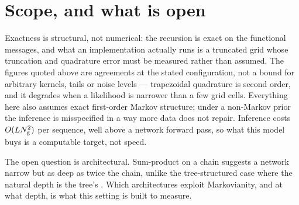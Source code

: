 \documentclass{article}
\begin{document}
\section{Scope, and what is open}

Exactness is structural, not numerical: the recursion is exact on the functional messages, and what
an implementation actually runs is a truncated grid whose truncation and quadrature error must be
measured rather than assumed. The figures quoted above are agreements at the stated configuration,
not a bound for arbitrary kernels, tails or noise levels --- trapezoidal quadrature is second order,
and it degrades when a likelihood is narrower than a few grid cells. Everything here also assumes
exact first-order Markov structure; under a non-Markov prior the inference is misspecified in a way
more data does not repair. Inference costs $O(LN_{\mathrm{g}}^{2})$ per sequence, well above a network
forward pass, so what this model buys is a computable target, not speed.

The open question is architectural. Sum-product on a chain suggests a network narrow but as deep
as twice the chain, unlike the tree-structured case where the natural depth is the tree's
\citep{mei2024unet,garnierbrun2024transformers}. Which architectures exploit Markovianity, and at
what depth, is what this setting is built to measure.

\label{LastMainPage}



\clearpage
\appendix

\end{document}
